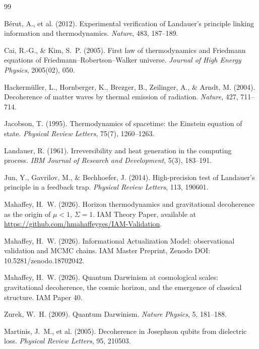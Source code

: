 \documentclass[12pt,a4paper]{article}
\begin{document}

\begin{thebibliography}{99}

B\'erut, A., et al. (2012).
Experimental verification of Landauer's principle linking information and
thermodynamics.
\textit{Nature}, 483, 187--189.

Cai, R.-G., \& Kim, S.\ P. (2005).
First law of thermodynamics and Friedmann equations of Friedmann--Robertson--Walker
universe.
\textit{Journal of High Energy Physics}, 2005(02), 050.

Hackerm\"uller, L., Hornberger, K., Brezger, B., Zeilinger, A., \& Arndt, M. (2004).
Decoherence of matter waves by thermal emission of radiation.
\textit{Nature}, 427, 711--714.

Jacobson, T. (1995).
Thermodynamics of spacetime: the Einstein equation of state.
\textit{Physical Review Letters}, 75(7), 1260--1263.

Landauer, R. (1961).
Irreversibility and heat generation in the computing process.
\textit{IBM Journal of Research and Development}, 5(3), 183--191.

Jun, Y., Gavrilov, M., \& Bechhoefer, J. (2014).
High-precision test of Landauer's principle in a feedback trap.
\textit{Physical Review Letters}, 113, 190601.

Mahaffey, H.\ W. (2026).
Horizon thermodynamics and gravitational decoherence as the origin of
$\mu < 1$, $\Sigma = 1$.
IAM Theory Paper, available at
\url{https://github.com/hmahaffeyges/IAM-Validation}.

Mahaffey, H.\ W. (2026).
Informational Actualization Model: observational validation and MCMC chains.
IAM Master Preprint, Zenodo DOI: 10.5281/zenodo.18702042.

Mahaffey, H.\ W. (2026).
Quantum Darwinism at cosmological scales: gravitational decoherence, the
cosmic horizon, and the emergence of classical structure.
IAM Paper 40.

Zurek, W.\ H. (2009).
Quantum Darwinism.
\textit{Nature Physics}, 5, 181--188.

Martinis, J.\ M., et al. (2005).
Decoherence in Josephson qubits from dielectric loss.
\textit{Physical Review Letters}, 95, 210503.


\end{thebibliography}
\end{document}
